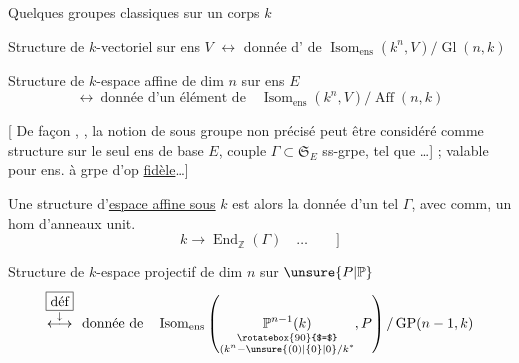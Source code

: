 Quelques groupes classiques sur un corps $k$



Structure de $k$-vectoriel  sur ens $V$ $\longleftrightarrow$ donnée d'  de $\operatorname{Isom}_{\text{ens}}(k^n,V)/\operatorname{Gl}(n,k)$

Structure de $k$-espace affine de dim $n$ sur  ens $E$
\[
\longleftrightarrow\ \text{donnée d'un élément de}\quad
\operatorname{Isom}_{\text{ens}}(k^n,V)/\operatorname{Aff}(n,k)
\]

[ De façon , , la notion de  sous groupe non précisé peut être considéré comme structure sur le seul ens de base $E$,   couple $\Gamma\subset\mathfrak{S}_{E}$ ss-grpe, tel que \ldots ] ; valable pour ens. à grpe d'op \uline{fidèle}\ldots ]

Une structure d'\uline{espace affine sous} $k$ est alors la donnée d'un tel $\Gamma$, avec  comm,  un hom d'anneaux unit.
\[
 k\longrightarrow\operatorname{End}_{\mathbb{Z}}(\Gamma)\quad\ldots\qquad ]
\]

Structure de $k$-espace projectif de dim $n$ sur $\unsure{P|\mathbb P}$
\[
\overset{\substack{\boxed{\text{déf}}\\\downarrow}}{\longleftrightarrow}
\ \text{donnée de}\quad
\operatorname{Isom}_{\text{ens}} \left(
 \underset{\substack{\rotatebox{90}{$=$}\\(k^n-\unsure{(0)|\{0\}|0}/k^*}}{\mathbb{P}^{n-1}(k)},P\right)
 /\operatorname{GP}(n-1,k)
\]

